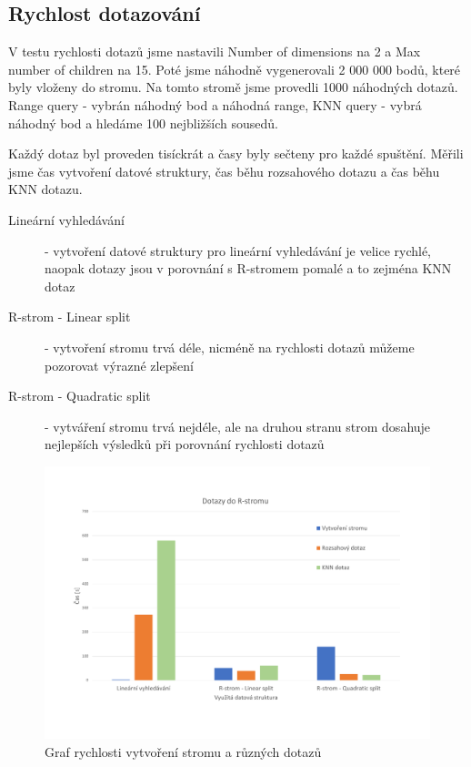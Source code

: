 \documentclass[a4paper,10pt]{article}
\begin{document}
\subsection{Rychlost dotazování}
V testu rychlosti dotazů jsme nastavili Number of dimensions na 2 a Max number of children na 15. Poté jsme náhodně vygenerovali 2 000 000 bodů, které byly vloženy do stromu. Na tomto stromě jsme provedli 1000 náhodných dotazů. Range query - vybrán náhodný bod a náhodná range, KNN query - vybrá náhodný bod a hledáme 100 nejbližších sousedů.

Každý dotaz byl proveden tisíckrát a časy byly sečteny pro každé spuštění. Měřili jsme čas vytvoření datové struktury, čas běhu rozsahového dotazu a čas běhu KNN dotazu.
\begin{description}
	\item[Lineární vyhledávání] - vytvoření datové struktury pro lineární vyhledávání je velice rychlé, naopak dotazy jsou v porovnání s R-stromem pomalé a to zejména KNN dotaz
    \item[R-strom - Linear split] - vytvoření stromu trvá déle, nicméně na rychlosti dotazů můžeme pozorovat výrazné zlepšení
    \item[R-strom - Quadratic split] - vytváření stromu trvá nejdéle, ale na druhou stranu strom dosahuje nejlepších výsledků při porovnání rychlosti dotazů
\end{description}

\begin{figure}
    \includegraphics[width=\textwidth]{Query.pdf}
    \caption{Graf rychlosti vytvoření stromu a různých dotazů}
    \label{fig:query}
\end{figure}
\end{document}
